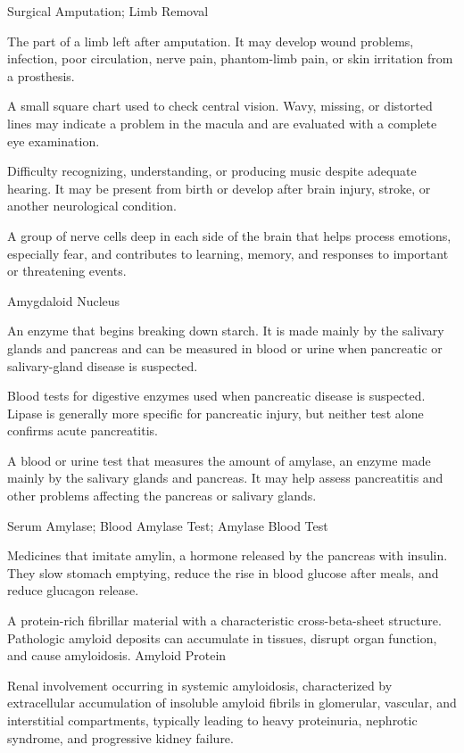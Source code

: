 \synonyms
Surgical Amputation; Limb Removal

 The part of a limb left after amputation. It may develop wound problems, infection, poor circulation, nerve pain, phantom-limb pain, or skin irritation from a prosthesis.

 A small square chart used to check central vision. Wavy, missing, or distorted lines may indicate a problem in the macula and are evaluated with a complete eye examination.

 Difficulty recognizing, understanding, or producing music despite adequate hearing. It may be present from birth or develop after brain injury, stroke, or another neurological condition.

 A group of nerve cells deep in each side of the brain that helps process emotions, especially fear, and contributes to learning, memory, and responses to important or threatening events.

\synonyms
Amygdaloid Nucleus

 An enzyme that begins breaking down starch. It is made mainly by the salivary glands and pancreas and can be measured in blood or urine when pancreatic or salivary-gland disease is suspected.

 Blood tests for digestive enzymes used when pancreatic disease is suspected. Lipase is generally more specific for pancreatic injury, but neither test alone confirms acute pancreatitis.

 A blood or urine test that measures the amount of amylase, an enzyme made mainly by the salivary glands and pancreas. It may help assess pancreatitis and other problems affecting the pancreas or salivary glands.

\synonyms
Serum Amylase; Blood Amylase Test; Amylase Blood Test

 Medicines that imitate amylin, a hormone released by the pancreas with insulin. They slow stomach emptying, reduce the rise in blood glucose after meals, and reduce glucagon release.

 A protein-rich fibrillar material with a characteristic cross-beta-sheet structure. Pathologic amyloid deposits can accumulate in tissues, disrupt organ function, and cause amyloidosis.
\synonyms
Amyloid Protein

 Renal involvement occurring in systemic amyloidosis, characterized by extracellular accumulation of insoluble amyloid fibrils in glomerular, vascular, and interstitial compartments, typically leading to heavy proteinuria, nephrotic syndrome, and progressive kidney failure.

